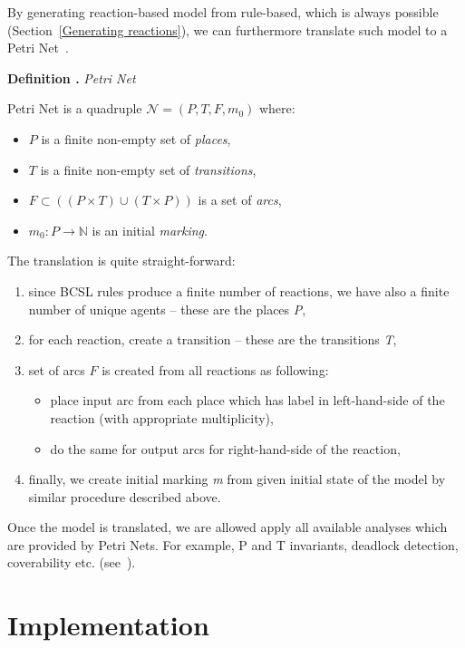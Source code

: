 \documentclass[12pt]{fithesis2}
\newcounter{counter}[section]
\renewcommand{\thecounter}{\thesection.\arabic{counter}}
\newenvironment{definition}[1]{\bigskip\refstepcounter{counter}\noindent\textbf{Definition \thecounter } \textit{#1} \par\nopagebreak}{\bigskip}
\begin{document}
By generating reaction-based model from rule-based, which is always possible (Section~\ref{Generating reactions}), we can furthermore translate such model to a Petri Net~\cite{petri}.

\begin{definition}{Petri Net}
Petri Net is a quadruple $\mathcal{N} = (P, T, F, m_0)$ where:

\begin{itemize}
	\item $P$ is a finite non-empty set of \emph{places},
	\item $T$ is a finite non-empty set of \emph{transitions},
	\item $F \subset ((P \times T) \cup (T \times P)) $ is a set of \emph{arcs},
	\item $m_0 : P \rightarrow \mathbb{N}$ is an initial \emph{marking}.
\end{itemize}
\end{definition}

The translation is quite straight-forward: 

\begin{enumerate}
\item since BCSL rules produce a finite number of reactions, we have also a finite number of unique agents -- these are the places \emph{P},
\item for each reaction, create a transition -- these are the transitions \emph{T},
\item set of arcs $F$ is created from all reactions as following:
\begin{itemize}
  \item place input arc from each place which has label in left-hand-side of the reaction (with appropriate multiplicity),
  \item do the same for output arcs for right-hand-side of the reaction,
\end{itemize}
\item finally, we create initial marking \emph{m} from given initial state of the model by similar procedure described above.
\end{enumerate}

Once the model is translated, we are allowed apply all available analyses which are provided by Petri Nets. For example, P and T invariants, deadlock detection, coverability etc. (see~\cite{petri}).

\chapter{Implementation}
\end{document}
